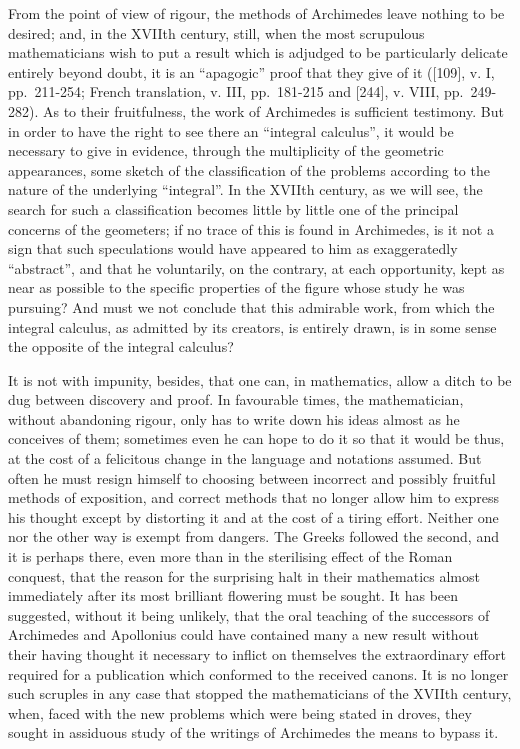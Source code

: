 From the point of view of rigour, the methods of Archimedes leave nothing to be desired; and, in the XVIIth century, still, when the most scrupulous mathematicians wish to put a result which is adjudged to be particularly delicate entirely beyond doubt, it is an ``apagogic'' proof that they give of it ({[}109{]}, v. I, pp.~211-254; French translation, v. III, pp.~181-215 and {[}244{]}, v. VIII, pp.~249-282). As to their fruitfulness, the work of Archimedes is sufficient testimony. But in order to have the right to see there an ``integral calculus'', it would be necessary to give in evidence, through the multiplicity of the geometric appearances, some sketch of the classification of the problems according to the nature of the underlying ``integral''. In the XVIIth century, as we will see, the search for such a classification becomes little by little one of the principal concerns of the geometers; if no trace of this is found in Archimedes, is it not a sign that such speculations would have appeared to him as exaggeratedly ``abstract'', and that he voluntarily, on the contrary, at each opportunity, kept as near as possible to the specific properties of the figure whose study he was pursuing? And must we not conclude that this admirable work, from which the integral calculus, as admitted by its creators, is entirely drawn, is in some sense the opposite of the integral calculus?

It is not with impunity, besides, that one can, in mathematics, allow a ditch to be dug between discovery and proof. In favourable times, the mathematician, without abandoning rigour, only has to write down his ideas almost as he conceives of them; sometimes even he can hope to do it so that it would be thus, at the cost of a felicitous change in the language and notations assumed. But often he must resign himself to choosing between incorrect and possibly fruitful methods of exposition, and correct methods that no longer allow him to express his thought except by distorting it and at the cost of a tiring effort. Neither one nor the other way is exempt from dangers. The Greeks followed the second, and it is perhaps there, even more than in the sterilising effect of the Roman conquest, that the reason for the surprising halt in their mathematics almost immediately after its most brilliant flowering must be sought. It has been suggested, without it being unlikely, that the oral teaching of the successors of Archimedes and Apollonius could have contained many a new result without their having thought it necessary to inflict on themselves the extraordinary effort required for a publication which conformed to the received canons. It is no longer such scruples in any case that stopped the mathematicians of the XVIIth century, when, faced with the new problems which were being stated in droves, they sought in assiduous study of the writings of Archimedes the means to bypass it.

